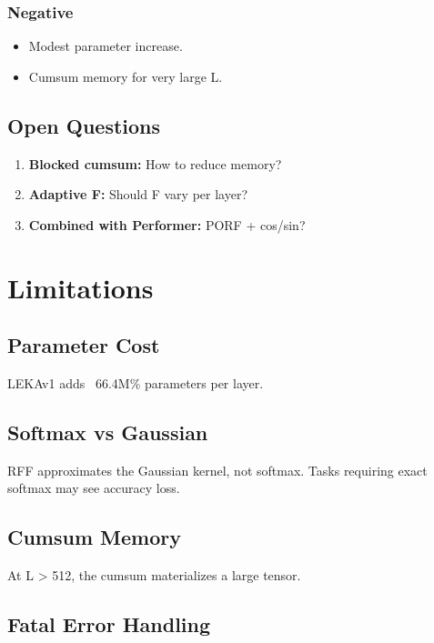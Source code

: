 \subsubsection{Negative}
\begin{itemize}
\item Modest parameter increase.
\item Cumsum memory for very large L.

\end{itemize}
\subsection{Open Questions}

\begin{enumerate}
\item \textbf{Blocked cumsum:} How to reduce memory?
\item \textbf{Adaptive F:} Should F vary per layer?
\item \textbf{Combined with Performer:} PORF + cos/sin?

\end{enumerate}


\section{Limitations}

\subsection{Parameter Cost}

LEKAv1 adds ~66.4M\% parameters per layer.

\subsection{Softmax vs Gaussian}

RFF approximates the Gaussian kernel, not softmax. Tasks requiring exact 
softmax may see accuracy loss.

\subsection{Cumsum Memory}

At L \textgreater{} 512, the cumsum materializes a large tensor.

\subsection{Fatal Error Handling}

